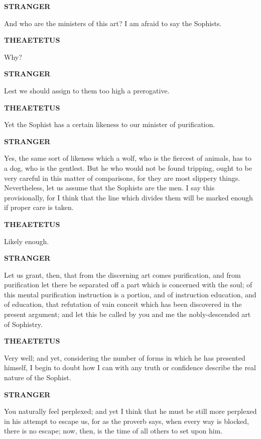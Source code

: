 \documentclass[11pt,letter]{article}
\begin{document}
\par \textbf{STRANGER}
\par   And who are the ministers of this art? I am afraid to say the Sophists.

\par \textbf{THEAETETUS}
\par   Why?

\par \textbf{STRANGER}
\par   Lest we should assign to them too high a prerogative.

\par \textbf{THEAETETUS}
\par   Yet the Sophist has a certain likeness to our minister of purification.

\par \textbf{STRANGER}
\par   Yes, the same sort of likeness which a wolf, who is the fiercest of animals, has to a dog, who is the gentlest. But he who would not be found tripping, ought to be very careful in this matter of comparisons, for they are most slippery things. Nevertheless, let us assume that the Sophists are the men. I say this provisionally, for I think that the line which divides them will be marked enough if proper care is taken.

\par \textbf{THEAETETUS}
\par   Likely enough.

\par \textbf{STRANGER}
\par   Let us grant, then, that from the discerning art comes purification, and from purification let there be separated off a part which is concerned with the soul; of this mental purification instruction is a portion, and of instruction education, and of education, that refutation of vain conceit which has been discovered in the present argument; and let this be called by you and me the nobly-descended art of Sophistry.

\par \textbf{THEAETETUS}
\par   Very well; and yet, considering the number of forms in which he has presented himself, I begin to doubt how I can with any truth or confidence describe the real nature of the Sophist.

\par \textbf{STRANGER}
\par   You naturally feel perplexed; and yet I think that he must be still more perplexed in his attempt to escape us, for as the proverb says, when every way is blocked, there is no escape; now, then, is the time of all others to set upon him.
\end{document}
